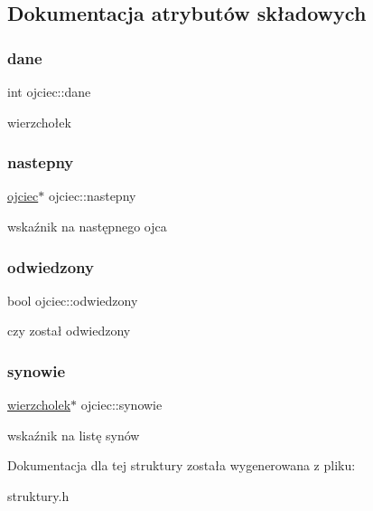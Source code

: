 \subsection{Dokumentacja atrybutów składowych}
\mbox{\label{structojciec_a00cd793091881a3fe5244e47248c674e}} 
\subsubsection{\texorpdfstring{dane}{dane}}
{\footnotesize\ttfamily int ojciec\+::dane}

wierzchołek \mbox{\label{structojciec_a80e11ec3ccb56da59f2145a171e8e436}} 
\subsubsection{\texorpdfstring{nastepny}{nastepny}}
{\footnotesize\ttfamily \hyperlink{structojciec}{ojciec}$\ast$ ojciec\+::nastepny}

wskaźnik na następnego ojca \mbox{\label{structojciec_ab6946ed8062440756408c1608c9614da}} 
\subsubsection{\texorpdfstring{odwiedzony}{odwiedzony}}
{\footnotesize\ttfamily bool ojciec\+::odwiedzony}

czy został odwiedzony \mbox{\label{structojciec_a73c0e6fc33374aea30d4b54a0a636d04}} 
\subsubsection{\texorpdfstring{synowie}{synowie}}
{\footnotesize\ttfamily \hyperlink{structwierzcholek}{wierzcholek}$\ast$ ojciec\+::synowie}

wskaźnik na listę synów 

Dokumentacja dla tej struktury została wygenerowana z pliku\+:\begin{DoxyCompactItemize}
\item 
struktury.\+h\end{DoxyCompactItemize}
